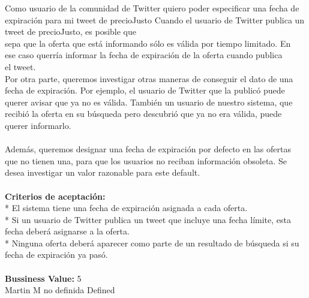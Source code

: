 	{Como usuario de la comunidad de Twitter quiero poder especificar una fecha de expiración para mi tweet de precioJusto} %
	{Cuando el usuario de Twitter publica un tweet de precioJusto, es posible que\\
sepa que la oferta que está informando sólo es válida por tiempo limitado. En\\
ese caso querría informar la fecha de expiración de la oferta cuando publica\\
el tweet.\\
Por otra parte, queremos investigar otras maneras de conseguir el dato de una\\
fecha de expiración. Por ejemplo, el usuario de Twitter que la publicó puede\\
querer avisar que ya no es válida. También un usuario de nuestro sistema, que\\
recibió la oferta en su búsqueda pero descubrió que ya no era válida, puede\\
querer informarlo.\\
  \\
Además, queremos designar una fecha de expiración por defecto en las ofertas\\
que no tienen una, para que los usuarios no reciban información obsoleta. Se\\
desea investigar un valor razonable para este default.\\
  \\
\textbf{Criterios de aceptación:}\\
* El sistema tiene una fecha de expiración asignada a cada oferta.  \\
* Si un usuario de Twitter publica un tweet que incluye una fecha límite, esta fecha deberá asignarse a la oferta.  \\
* Ninguna oferta deberá aparecer como parte de un resultado de búsqueda si su fecha de expiración ya pasó. \\
  \\
\textbf{Bussiness Value:} 5\\
} %
	{} %
	{} %
	{Martin M} %
	{no definida} %
	{Defined} %


\vspace{20pt}

